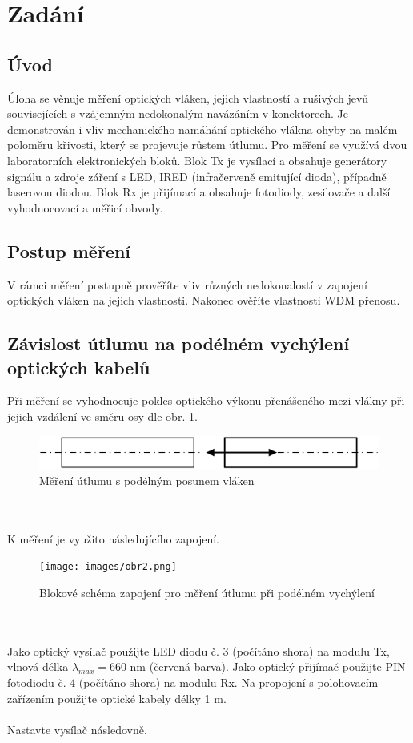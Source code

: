 
\section{Zadání}
\subsection{Úvod}
Úloha se věnuje měření optických vláken, jejich vlastností a rušivých jevů souvisejících s vzájemným nedokonalým navázáním v konektorech. Je demonstrován i vliv mechanického namáhání optického vlákna ohyby na malém poloměru křivosti, který se projevuje růstem útlumu. Pro měření se využívá dvou laboratorních elektronických bloků. Blok Tx je vysílací a obsahuje generátory signálu a zdroje záření s LED, IRED (infračerveně emitující dioda), případně laserovou diodou. Blok Rx je přijímací a obsahuje fotodiody, zesilovače a další vyhodnocovací a měřicí obvody.

\subsection{Postup měření}
V rámci měření postupně prověříte vliv různých nedokonalostí v zapojení optických vláken na jejich vlastnosti. Nakonec ověříte vlastnosti WDM přenosu.

\subsection{Závislost útlumu na podélném vychýlení optických kabelů}
Při měření se vyhodnocuje pokles optického výkonu přenášeného mezi vlákny při jejich vzdálení ve směru osy dle obr. 1.
\begin{figure}[h]
\centering
\includegraphics[width=12cm]{images/obr1.png}
\caption{Měření útlumu s podélným posunem vláken}
\label{fig:1}
\end{figure}
\\\\
K měření je využito následujícího zapojení.
\begin{figure}[h]
\centering
\texttt{[image: images/obr2.png]}
\caption{Blokové schéma zapojení pro měření útlumu při podélném vychýlení}
\label{fig:2}
\end{figure}
\\\\
Jako optický vysílač použijte LED diodu č. 3 (počítáno shora) na modulu Tx, vlnová délka $\lambda_{max}=660$ nm (červená barva). Jako optický přijímač použijte PIN fotodiodu č. 4 (počítáno shora) na modulu Rx. Na propojení s polohovacím zařízením použijte optické kabely délky 1 m.
\\\\
Nastavte vysílač následovně.

